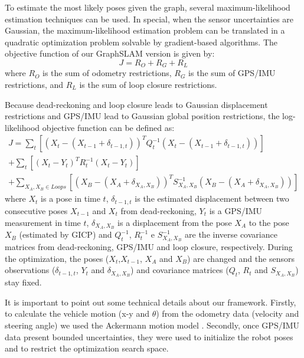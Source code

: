 To estimate the most likely poses given the graph, several maximum-likelihood estimation techniques can be used. In special, when the sensor uncertainties are Gaussian, the maximum-likelihood estimation problem can be translated in a quadratic optimization problem solvable by gradient-based algorithms. The objective function of our GraphSLAM version is given by:
\begin{equation}
\label{Eq::GSLAMOBJ}
J=R_O+R_G+R_L
\end{equation}
where $R_O$ is the sum of odometry restrictions, $R_G$ is the sum of GPS/IMU restrictions, and $R_L$ is the sum of loop closure restrictions.

Because dead-reckoning and loop closure leads to Gaussian displacement restrictions and GPS/IMU lead to Gaussian global position restrictions, the log-likelihood objective function can be defined as:
\begin{equation}
\label{Eq::GSLAMlikelihoodOBJ}
\begin{array}{c}
J = \sum_{t}\left[ (X_t-(X_{t-1}+\delta_{t-1, t}))^TQ_t^{-1}(X_t-(X_{t-1}+\delta_{t-1, t}))\right]  \\
 + \sum_{t}\left[ (X_t-Y_t)^T R_t^{-1}(X_t-Y_t)\right]  \\
 + \sum_{X_A,X_B\in Loops}\left[ (X_B-(X_A+\delta_{X_A, X_B}))^TS_{X_A,X_B}^{-1}(X_B-(X_A+\delta_{X_A, X_B}))\right]
\end{array}
\end{equation}
where $X_t$ is a pose in time $t$,  $\delta_{t-1, t}$ is the estimated displacement between two consecutive poses $X_{t-1}$ and $X_t$ from dead-reckoning, $Y_t$ is a GPS/IMU measurement in time $t$, $\delta_{X_A, X_B}$ is a displacement from the pose $X_A$ to the pose $X_B$ (estimated by GICP) and $Q_t^{-1}$, $R_t^{-1}$ e $S_{X_A,X_B}^{-1}$ are the inverse covariance matrices from dead-reckoning, GPS/IMU and loop closure, respectively. During the optimization, the poses ($X_t$,$X_{t-1}$, $X_A$ and $X_B$) are changed and the sensors observations ($\delta_{t-1, t}$, $Y_t$ and $\delta_{X_A, X_B}$) and covariance matrices ($Q_t$, $R_t$ and $S_{X_A,X_B}$) stay fixed.

It is important to point out some technical details about our framework. Firstly, to calculate the vehicle motion (x-y and $\theta$) from the odometry data (velocity and steering angle) we used the Ackermann motion model \cite{50wickens2005fundamentals}. Secondly, once GPS/IMU data present bounded uncertainties, they were used to initialize the robot poses and to restrict the optimization search space.



